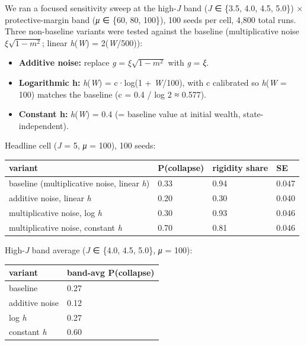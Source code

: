 \documentclass[11pt,letterpaper]{article}
\providecommand{\tightlist}{\setlength{\itemsep}{0pt}\setlength{\parskip}{0pt}}
\newcounter{none}
\begin{document}
We ran a focused sensitivity sweep at the high-\emph{J} band (\emph{J} ∈ \{3.5, 4.0, 4.5, 5.0\}) × protective-margin band (\emph{μ} ∈ \{60, 80, 100\}), 100 seeds per cell, 4,800 total runs. Three non-baseline variants were tested against the baseline (multiplicative noise \(\xi \sqrt{1-m^2}\); linear \emph{h}(\emph{W}) = 2(\emph{W}/500)):

\begin{itemize}
\tightlist
\item
  \textbf{Additive noise:} replace \emph{g} = \(\xi \sqrt{1-m^2}\) with \emph{g} = \emph{ξ}.
\item
  \textbf{Logarithmic h:} \emph{h}(\emph{W}) = c·log(1 + \emph{W}/100), with c calibrated so \emph{h}(\emph{W} = 100) matches the baseline (c = 0.4 / log 2 ≈ 0.577).
\item
  \textbf{Constant h:} \emph{h}(\emph{W}) = 0.4 (= baseline value at initial wealth, state-independent).
\end{itemize}

Headline cell (\emph{J} = 5, \emph{μ} = 100), 100 seeds:

{\def\LTcaptype{none} %
\begin{longtable}[]{@{}llll@{}}
\toprule\noalign{}
variant & P(collapse) & rigidity share & SE \\
\midrule\noalign{}
\endhead
\bottomrule\noalign{}
\endlastfoot
baseline (multiplicative noise, linear \emph{h}) & 0.33 & 0.94 & 0.047 \\
additive noise, linear \emph{h} & 0.20 & 0.30 & 0.040 \\
multiplicative noise, log \emph{h} & 0.30 & 0.93 & 0.046 \\
multiplicative noise, constant \emph{h} & 0.70 & 0.81 & 0.046 \\
\end{longtable}
}

High-\emph{J} band average (\emph{J} ∈ \{4.0, 4.5, 5.0\}, \emph{μ} = 100):

{\def\LTcaptype{none} %
\begin{longtable}[]{@{}ll@{}}
\toprule\noalign{}
variant & band-avg P(collapse) \\
\midrule\noalign{}
\endhead
\bottomrule\noalign{}
\endlastfoot
baseline & 0.27 \\
additive noise & 0.12 \\
log \emph{h} & 0.27 \\
constant \emph{h} & 0.60 \\
\end{longtable}
}
\end{document}
